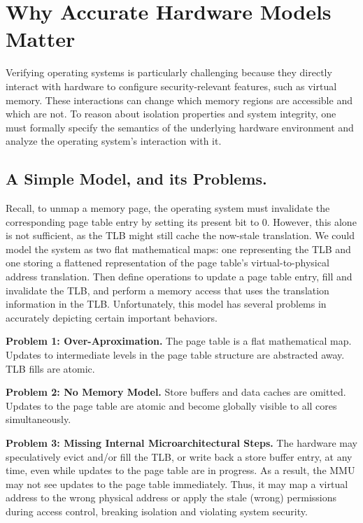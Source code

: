 \section{Why Accurate Hardware Models Matter}\label{sec:motivation}

Verifying operating systems is particularly challenging because they directly interact with hardware to configure security-relevant features, such as virtual memory.
These interactions can change which memory regions are accessible and which are not. 
To reason about isolation properties and system integrity, one must formally specify the semantics of the underlying hardware environment and analyze the operating system's interaction with it. 

\subsection{A Simple Model, and its Problems.}

Recall, to unmap a memory page, the operating system must invalidate the corresponding page table entry by setting its present bit to 0. However, this alone is not sufficient, as the TLB might still cache the now-stale translation. 
We could model the system as two flat mathematical maps: one representing the TLB and one storing a flattened representation of the page table's virtual-to-physical address translation. Then define operations to update a page table entry, fill and invalidate the TLB, and perform a memory access that uses the translation information in the TLB. 
%
Unfortunately, this model has several problems in accurately depicting certain important behaviors.

\noindent\textbf{Problem 1: Over-Aproximation.} 
The page table is a flat mathematical map. Updates to intermediate levels in the page table structure are abstracted away. TLB fills are atomic. 

\noindent\textbf{Problem 2: No Memory Model.}
Store buffers and data caches are omitted. Updates to the page table are atomic and become globally visible to all cores simultaneously.


\noindent\textbf{Problem 3: Missing Internal Microarchitectural Steps.}
The hardware may speculatively evict and/or fill the TLB, or write back a store buffer entry, at any time, even while updates to the page table are in progress. As a result, the MMU may not see updates to the page table immediately. Thus, it may map a virtual address to the wrong physical address or apply the stale (wrong) permissions during access control, breaking isolation and violating system security.

